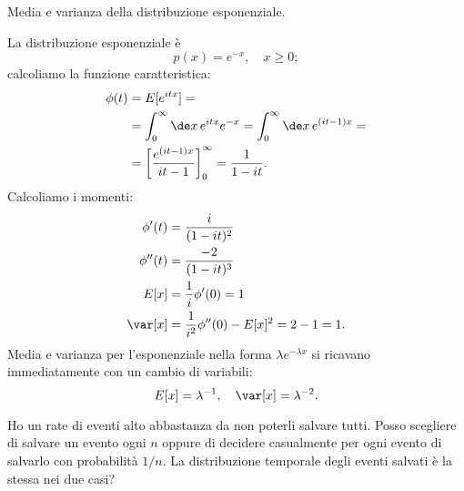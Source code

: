 \begin{exercise}
	Media e varianza della distribuzione esponenziale.
\end{exercise}

\begin{solution*}
	La distribuzione esponenziale è
	\begin{equation*}
		p(x) = e^{-x}, \quad x \ge 0;
	\end{equation*}
	calcoliamo la funzione caratteristica:
	\begin{align*}
		\phi(t) &=  E[e^{itx}] = \\
		&= \int_0^\infty \de x\, e^{itx}e^{-x} = \int_0^\infty \de x\, e^{(it-1)x} = \\
		&= \left[ \frac{e^{(it-1)x}}{it-1} \right]_0^\infty = \frac1{1-it}.
	\end{align*}
	Calcoliamo i momenti:
	\begin{align*}
		\phi'(t) &= \frac{i}{(1-it)^2} \\
		\phi''(t) &= \frac{-2}{(1-it)^3} \\
		E[x] &= \frac1i \phi'(0) = 1 \\
		\var[x] &= \frac1{i^2}\phi''(0) - E[x]^2 = 2 - 1 = 1.
	\end{align*}
	Media e varianza per l'esponenziale nella forma $\lambda e^{-\lambda x}$ si ricavano immediatamente con un cambio di variabili:
	\begin{equation*}
		E[x] = \lambda^{-1}, \quad \var[x] = \lambda^{-2}.
	\end{equation*}
\end{solution*}

\begin{exercise}
	\label{th:salvexp}
	Ho un rate di eventi alto abbastanza da non poterli salvare tutti. Posso scegliere di salvare un evento ogni $n$ oppure di decidere casualmente per ogni evento di salvarlo con probabilità $1/n$. La distribuzione temporale degli eventi salvati è la stessa nei due casi?
\end{exercise}

